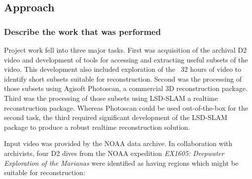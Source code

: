 \documentclass[letterpaper,12pt]{article}
\begin{document}


\subsection{Approach}
\subsubsection*{Describe the work that was performed}

Project work fell into three major tasks.  First was acquisition of the archival D2 video and development of tools for accessing and extracting useful subsets of the video.  This development also included exploration of the ~32 hours of video to identify short subsets suitable for reconstruction.   Second was the processing of those subsets using Agisoft Photoscan, a commercial 3D reconstruction package.   Third was the processing of those subsets using LSD-SLAM a realtime reconstruction package.  Whereas Photoscan could be used out-of-the-box for the second task, the third required significant development of the LSD-SLAM package to produce a robust realtime reconstruction solution.  

Input video was provided by the NOAA data archive.  In collaboration with archivists, four D2 dives from the NOAA expedition \textit{EX1605: Deepwater Exploration of the Marianas} were identified as having regions which might be suitable for reconstruction:
\end{document}
